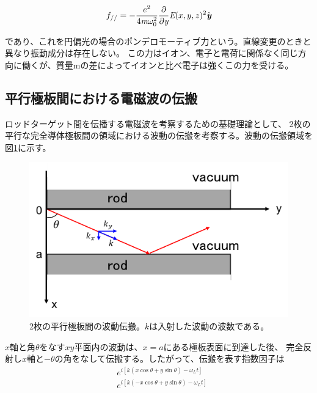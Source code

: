 \documentclass[a4paper,11pt,titlepage]{jarticle}
\numberwithin{equation}{section} %
\begin{document}
  \begin{eqnarray}
    f_{//}=- \frac{e^2 }{4 \textit{m} \omega _0^2}  \frac{\partial }{\partial \textit{y}}\textit{E}(x,y,z)^2 \hat{\textit{\textbf{y}}}
  \end{eqnarray}
  
  であり、これを円偏光の場合のポンデロモーティブ力という。直線変更のときと異なり振動成分は存在しない。
  この力はイオン、電子と電荷に関係なく同じ方向に働くが、質量mの差によってイオンと比べ電子は強くこの力を受ける。
  


  \subsection{平行極板間における電磁波の伝搬}
  ロッドターゲット間を伝播する電磁波を考察するための基礎理論として、
  2枚の平行な完全導体極板間の領域における波動の伝搬を考察する。波動の伝搬領域を図\ref{fig:2-5_導波管}に示す。
  \begin{figure}[H]
    \begin{center}
      \includegraphics[scale=0.6]{./image/2-5/2-5_導波管.png}
      \caption{
        \label{fig:2-5_導波管}
        2枚の平行極板間の波動伝搬。$k$は入射した波動の波数である。
      }
    \end{center}
  \end{figure} 
  $x$軸と角$\theta$をなす$xy$平面内の波動は、$x=a$にある極板表面に到達した後、
  完全反射し$x$軸と$-\theta$の角をなして伝搬する。したがって、伝搬を表す指数因子は
  \begin{eqnarray}
    \label{eq:2-5-1}
    & e^{i[k(x \cos \theta + y \sin \theta ) - \omega_L t ] }  \nonumber \\
    & e^{i[k( - x \cos \theta + y \sin \theta ) - \omega_L t ] }
  \end{eqnarray}
\end{document}
